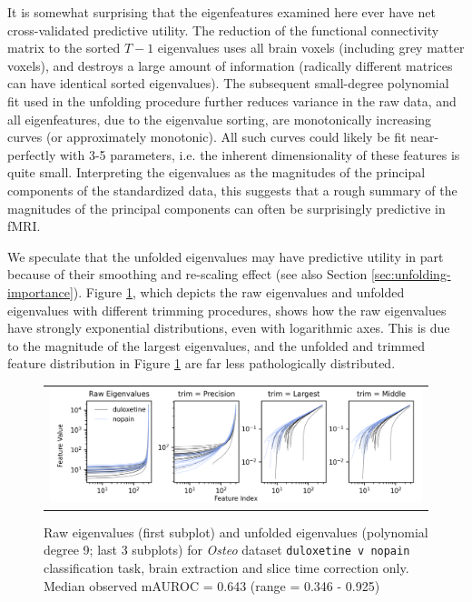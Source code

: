 \documentclass[12pt]{spieman}  %
\begin{document}
\begin{spacing}{2}
It is somewhat surprising that the eigenfeatures examined here ever have net
cross-validated predictive utility. The reduction of the functional
connectivity matrix to the sorted \(T - 1\) eigenvalues uses all brain voxels
(including grey matter voxels), and destroys a large amount of information
(radically different matrices can have identical sorted eigenvalues). The
subsequent small-degree polynomial fit used in the unfolding procedure further
reduces variance in the raw data, and all eigenfeatures, due to the eigenvalue
sorting, are monotonically increasing curves (or approximately monotonic). All
such curves could likely be fit near-perfectly with 3-5 parameters, i.e. the
inherent dimensionality of these features is quite small. Interpreting the eigenvalues
as the magnitudes of the principal components of the standardized data, this
suggests that a rough summary of the magnitudes of the principal components can
often be surprisingly predictive in fMRI.

We speculate that the unfolded eigenvalues may have predictive utility in part
because of their smoothing and re-scaling effect (see also Section
\ref{sec:unfolding-importance}). Figure \ref{fig:unfolded}, which depicts the
raw eigenvalues and unfolded eigenvalues with different trimming procedures,
shows how the raw eigenvalues have strongly exponential distributions, even
with logarithmic axes. This is due to the magnitude of the largest eigenvalues,
and the unfolded and trimmed feature distribution in Figure \ref{fig:unfolded}
are far less pathologically distributed.

\begin{figure}
\begin{center}
\begin{tabular}{c}
\includegraphics[width=6.5in]{unfolded_osteo_duloxetine_v_nopain.png}
\end{tabular}
\end{center}
\caption
{ \label{fig:unfolded} Raw eigenvalues (first subplot) and unfolded eigenvalues
(polynomial degree 9; last 3 subplots) for \textit{Osteo} dataset
\footnotesize\texttt{duloxetine v nopain} classification task, brain extraction
and slice time correction only. Median observed mAUROC = 0.643 (range = 0.346 -
0.925)}
\end{figure}


\end{spacing}
\end{document}
